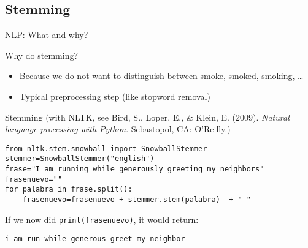 \documentclass{beamer}
\begin{document}
\subsection{Stemming}
\begin{frame}{NLP: What and why?}
\begin{block}{Why do stemming?}
\begin{itemize}
\item Because we do not want to distinguish between smoke, smoked, smoking, \ldots
\item Typical preprocessing step (like stopword removal)
\end{itemize}
\end{block}
\end{frame}









\begin{frame}[fragile]{Stemming}
{\footnotesize{(with NLTK, see Bird, S., Loper, E., \& Klein, E. (2009). \emph{Natural language processing with Python}. Sebastopol, CA: O’Reilly.)}}
\begin{lstlisting}
from nltk.stem.snowball import SnowballStemmer
stemmer=SnowballStemmer("english")
frase="I am running while generously greeting my neighbors"
frasenuevo=""
for palabra in frase.split():
    frasenuevo=frasenuevo + stemmer.stem(palabra)  + " "
\end{lstlisting}
If we now did {\tt{print(frasenuevo)}}, it would return:
\begin{lstlisting}
i am run while generous greet my neighbor
\end{lstlisting}
\end{frame}
\end{document}
